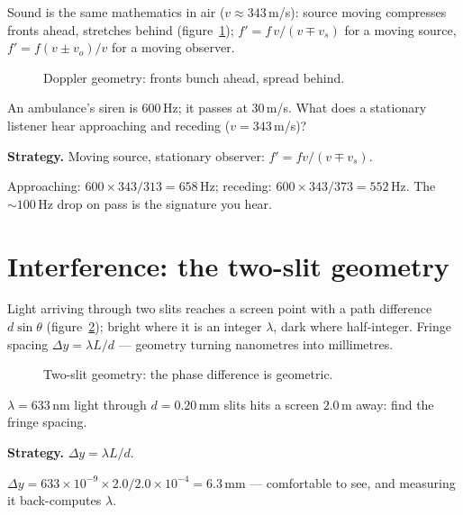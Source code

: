 Sound is the same mathematics in air ($v\approx343$\,m/s): source
moving compresses fronts ahead, stretches behind
(figure~\ref{fig:dopp});
$f'=f\,v/(v\mp v_s)$ for a moving source, $f'=f(v\pm v_o)/v$ for a
moving observer.

\begin{figure}[htbp]\centering

\caption{Doppler geometry: fronts bunch ahead, spread behind.}
\label{fig:dopp}
\end{figure}

\begin{example}\label{ex:dopp}
An ambulance's siren is $600$\,Hz; it passes at $30$\,m/s. What does a
stationary listener hear approaching and receding ($v=343$\,m/s)?
\par\smallskip
\textbf{Strategy.} Moving source, stationary observer:
$f'=fv/(v\mp v_s)$.
\begin{solution}
Approaching: $600\times343/313=658$\,Hz; receding:
$600\times343/373=552$\,Hz. The $\sim100$\,Hz drop on pass is the
signature you hear. \checkmark
\end{solution}
\end{example}

\section{Interference: the two-slit geometry}\label{sec:wav-2slit}

Light arriving through two slits reaches a screen point with a path
difference $d\sin\theta$ (figure~\ref{fig:2slit}); bright where it is
an integer $\lambda$, dark where half-integer. Fringe spacing
$\Delta y=\lambda L/d$ --- geometry turning nanometres into
millimetres.

\begin{figure}[htbp]\centering

\caption{Two-slit geometry: the phase difference is geometric.}
\label{fig:2slit}
\end{figure}

\begin{example}\label{ex:2slit}
$\lambda=633$\,nm light through $d=0.20$\,mm slits hits a screen
$2.0$\,m away: find the fringe spacing.
\par\smallskip
\textbf{Strategy.} $\Delta y=\lambda L/d$.
\begin{solution}
$\Delta y=633\times10^{-9}\times2.0/2.0\times10^{-4}=6.3$\,mm ---
comfortable to see, and measuring it back-computes $\lambda$.
\checkmark
\end{solution}
\end{example}

